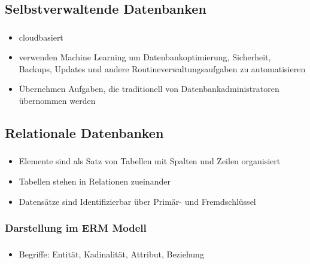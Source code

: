 \documentclass[aspectratio=169,14pt,xcolor=dvipsnames]{beamer}
\begin{document}
\subsection{Selbstverwaltende Datenbanken}
\begin{frame}[t]
    \frametitle{\subsecname}
    \begin{itemize}
        \item cloudbasiert
        \item verwenden Machine Learning um Datenbankoptimierung, Sicherheit, Backups, Updates und andere Routineverwaltungsaufgaben zu automatisieren
        \item Übernehmen Aufgaben, die traditionell von Datenbankadministratoren übernommen werden
    \end{itemize}
\end{frame}

\subsection{Relationale Datenbanken}
\begin{frame}[t]
    \frametitle{\subsecname}
    \begin{itemize}
        \item Elemente sind als Satz von Tabellen mit Spalten und Zeilen organisiert
        \item Tabellen stehen in Relationen zueinander
        \item Datensätze sind Identifizierbar über Primär- und Fremdschlüssel
    \end{itemize}
\end{frame}

\subsubsection{Darstellung im ERM Modell}
\begin{frame}[t]
    \frametitle{\subsecname}
    \framesubtitle{\subsubsecname}
    \begin{itemize}
        \item Begriffe: Entität, Kadinalität, Attribut, Beziehung
    \end{itemize}
    
\end{frame}

\begin{frame}[t]
    \frametitle{\subsecname}
    \framesubtitle{\subsubsecname}
    
\end{frame}
\end{document}
